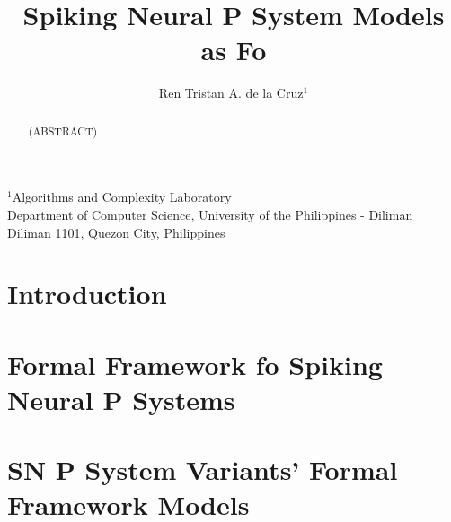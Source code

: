 \documentclass[a4paper]{article}
\begin{document}
\mainmatter

\title
{
Spiking Neural P System Models as Fo
}


\author
{
Ren Tristan A. de la Cruz$^1$
}



\institute
{
$^1$Algorithms and Complexity Laboratory \\
Department of Computer Science, University of the Philippines - Diliman\\
Diliman 1101, Quezon City, Philippines    \\
}

\newcommand{\ra}{\rightarrow}



\maketitle


\begin{abstract}

(ABSTRACT)

\end{abstract}


\section{Introduction}



\section{Formal Framework fo Spiking Neural P Systems} \label{s-ff}



\section{SN P System Variants' Formal Framework Models} \label{s-snp-ff}





\end{document}
